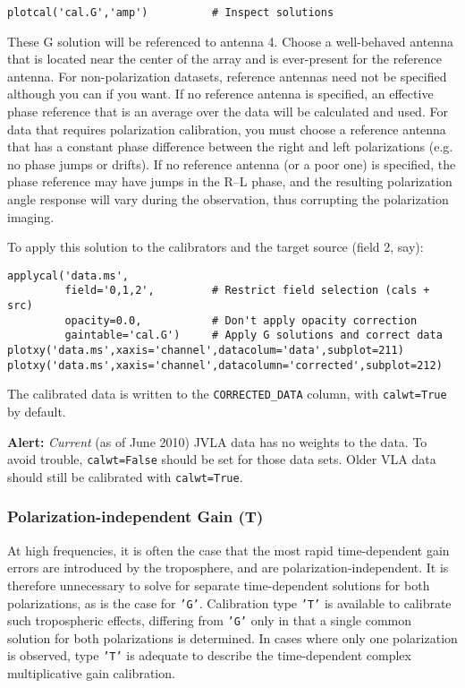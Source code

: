 {\begin{verbatim}
plotcal('cal.G','amp')          # Inspect solutions
\end{verbatim}
\normalsize

These G solution will be referenced to antenna 4.  Choose a
well-behaved antenna that is located near the center of the array and
is ever-present for the reference antenna.  For non-polarization
datasets, reference antennas need not be specified although you can if
you want.  If no reference antenna is specified, an effective phase
reference that is an average over the data will be calculated and
used.  For data that requires polarization calibration, you must
choose a reference antenna that has a constant phase difference
between the right and left polarizations (e.g. no phase jumps or
drifts).  If no reference antenna (or a poor one) is specified, the
phase reference may have jumps in the R--L phase, and the resulting
polarization angle response will vary during the observation, thus
corrupting the polarization imaging.

To apply this solution to the calibrators and the target source (field
2, say):
\small
\begin{verbatim}
applycal('data.ms',
         field='0,1,2',         # Restrict field selection (cals + src)
         opacity=0.0,           # Don't apply opacity correction
         gaintable='cal.G')     # Apply G solutions and correct data
plotxy('data.ms',xaxis='channel',datacolum='data',subplot=211)
plotxy('data.ms',xaxis='channel',datacolumn='corrected',subplot=212)
\end{verbatim}
\normalsize
The calibrated data is written to the {\tt CORRECTED\_DATA} column, with 
{\tt calwt=True} by default.

{\bf Alert:} {\it Current} (as of June 2010)  JVLA data has no weights
to the data. To avoid trouble, {\tt calwt=False} should be set for
those data sets. Older VLA data should still be calibrated with  {\tt calwt=True}.

\subsubsection{Polarization-independent Gain (T)}
\label{section:cal.solve.gain.t}

At high frequencies, it is often the case that the most rapid
time-dependent gain errors are introduced by the troposphere, and are
polarization-independent.  It is therefore unnecessary to solve for
separate time-dependent solutions for both polarizations, as is the
case for {\tt 'G'}.  Calibration type {\tt 'T'} is available to calibrate such
tropospheric effects, differing from {\tt 'G'} only in that a single common
solution for both polarizations is determined.  In cases where only
one polarization is observed, type {\tt 'T'} is adequate to describe the
time-dependent complex multiplicative gain calibration.

}
